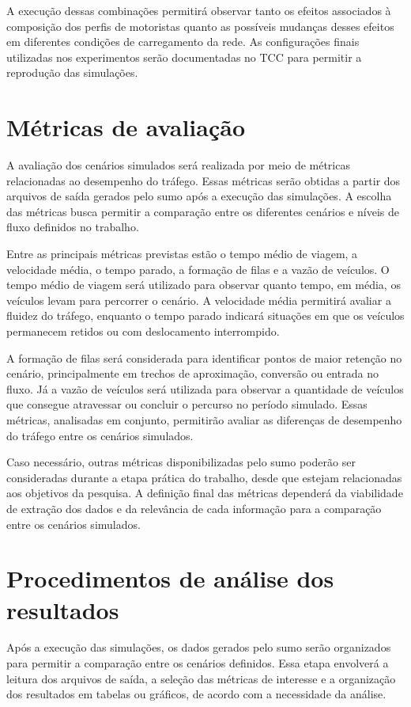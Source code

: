 A execução dessas combinações permitirá observar tanto os efeitos associados à composição dos perfis de motoristas quanto as possíveis mudanças desses efeitos em diferentes condições de carregamento da rede. As configurações finais utilizadas nos experimentos serão documentadas no TCC para permitir a reprodução das simulações.

\section{Métricas de avaliação}

A avaliação dos cenários simulados será realizada por meio de métricas relacionadas ao desempenho do tráfego. Essas métricas serão obtidas a partir dos arquivos de saída gerados pelo \gls{sumo} após a execução das simulações. A escolha das métricas busca permitir a comparação entre os diferentes cenários e níveis de fluxo definidos no trabalho.

Entre as principais métricas previstas estão o tempo médio de viagem, a velocidade média, o tempo parado, a formação de filas e a vazão de veículos. O tempo médio de viagem será utilizado para observar quanto tempo, em média, os veículos levam para percorrer o cenário. A velocidade média permitirá avaliar a fluidez do tráfego, enquanto o tempo parado indicará situações em que os veículos permanecem retidos ou com deslocamento interrompido.

A formação de filas será considerada para identificar pontos de maior retenção no cenário, principalmente em trechos de aproximação, conversão ou entrada no fluxo. Já a vazão de veículos será utilizada para observar a quantidade de veículos que consegue atravessar ou concluir o percurso no período simulado. Essas métricas, analisadas em conjunto, permitirão avaliar as diferenças de desempenho do tráfego entre os cenários simulados.

Caso necessário, outras métricas disponibilizadas pelo \gls{sumo} poderão ser consideradas durante a etapa prática do trabalho, desde que estejam relacionadas aos objetivos da pesquisa. A definição final das métricas dependerá da viabilidade de extração dos dados e da relevância de cada informação para a comparação entre os cenários simulados.

\section{Procedimentos de análise dos resultados}

Após a execução das simulações, os dados gerados pelo \gls{sumo} serão organizados para permitir a comparação entre os cenários definidos. Essa etapa envolverá a leitura dos arquivos de saída, a seleção das métricas de interesse e a organização dos resultados em tabelas ou gráficos, de acordo com a necessidade da análise.

